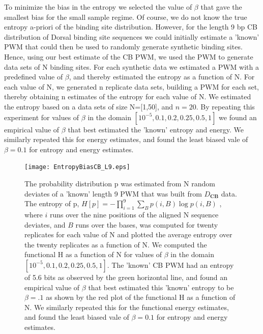To minimize the bias in the entropy we selected the value of $\beta$ that gave the smallest bias for the small sample regime.  Of course, we do not know the true entropy a-priori of the binding site distribution.  However, for the length 9 bp CB distribution of Dorsal binding site sequences we could initially estimate a 'known' PWM that could then be used to randomly generate synthetic binding sites.  Hence, using our best estimate of the CB PWM, we used the PWM to generate data sets of N binding sites.  For each synthetic data we estimated a PWM with a predefined value of $\beta$, and thereby estimated the entropy as a function of N.  For each value of N, we generated n replicate data sets, building a PWM for each set, thereby obtaining n estimates of the entropy for each value of N.  We estimated the entropy based on a data sets of size N=[1,50], and $n=20$.  By repeating this experiment for values of $\beta$ in the domain $[10^{-5},0.1,0.2,0.25,0.5, 1]$ we found an empirical value of $\beta$ that best estimated the 'known' entropy and energy.  We similarly repeated this for energy estimates, and found the least biased vale of $\beta=0.1$ for entropy and energy estimates.
\begin{figure}[!htbp]
\label{entropybias}
\texttt{[image: EntropyBiasCB\_L9.eps]}
\caption{ The probability distribution p was estimated from N random deviates of a 'known' length 9 PWM that was built from $D_\textbf{CB}$ data.  The entropy of p, $H[p]=-\prod_{i=1}^9 \sum_B p(i,B) \log p(i,B)$ , where $i$ runs over the nine positions of the aligned N sequence deviates, and $B$ runs over the bases, was computed for twenty replicates for each value of N and plotted the average entropy over the twenty replicates as a function of N.  We computed the functional H as a function of N for values of $\beta$ in the domain $[10^{-5},0.1,0.2,0.25,0.5, 1]$.  The 'known' CB PWM had an entropy of 5.6 bits as observed by the green horizontal line, and found an empirical value of $\beta$ that best estimated this 'known' entropy to be $\beta=.1$ as shown by the red plot of the functional H as a function of N.  We similarly repeated this for the functional energy estimates, and found the least biased vale of $\beta=0.1$ for entropy and energy estimates.}
\end{figure}



